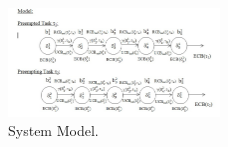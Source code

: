 \begin{figure}[h!]
\begin{center}
\includegraphics[width=0.5\textwidth]{system_model.jpg}
\caption{System Model.}
\label{fig:system_model}
\end{center}
\end{figure}
%

